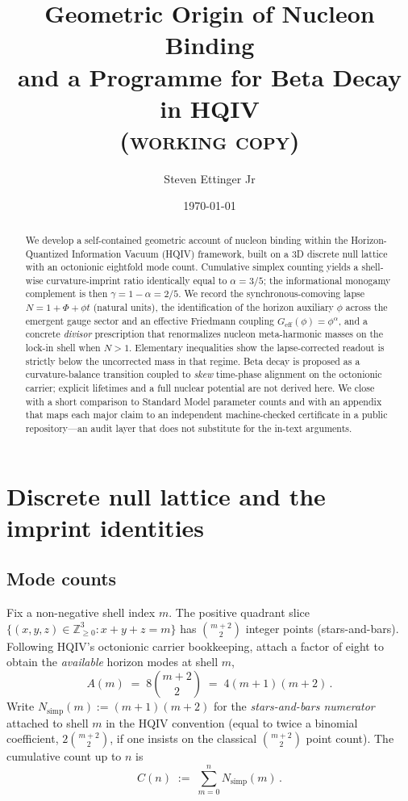 \documentclass[11pt,a4paper]{article}
\title{Geometric Origin of Nucleon Binding\\and a Programme for Beta Decay in HQIV\\{\large\scshape (working copy)}}
\author{Steven Ettinger Jr}
\date{\today}
\theoremstyle{plain}
\theoremstyle{definition}
\theoremstyle{remark}
\theoremstyle{plain}
\theoremstyle{definition}
\begin{document}
\maketitle

\begin{abstract}
We develop a self-contained geometric account of nucleon binding within the Horizon-Quantized Information Vacuum (HQIV) framework, built on a $3$D discrete null lattice with an octonionic eightfold mode count.
Cumulative simplex counting yields a shell-wise curvature-imprint ratio identically equal to $\alpha=3/5$; the informational monogamy complement is then $\gamma=1-\alpha=2/5$.
We record the synchronous-comoving lapse $N=1+\Phi+\phi t$ (natural units), the identification of the horizon auxiliary $\phi$ across the emergent gauge sector and an effective Friedmann coupling $G_{\mathrm{eff}}(\phi)=\phi^{\alpha}$, and a concrete \emph{divisor} prescription that renormalizes nucleon meta-harmonic masses on the lock-in shell when $N>1$.
Elementary inequalities show the lapse-corrected readout is strictly below the uncorrected mass in that regime.
Beta decay is proposed as a curvature-balance transition coupled to \emph{skew} time-phase alignment on the octonionic carrier; explicit lifetimes and a full nuclear potential are not derived here.
We close with a short comparison to Standard Model parameter counts and with an appendix that maps each major claim to an independent machine-checked certificate in a public repository---an audit layer that does not substitute for the in-text arguments.
\end{abstract}

\section{Discrete null lattice and the imprint identities}

\subsection{Mode counts}

Fix a non-negative shell index $m$.
The positive quadrant slice $\{(x,y,z)\in\mathbb{Z}_{\ge 0}^3 : x+y+z=m\}$ has $\binom{m+2}{2}$ integer points (stars-and-bars).
Following HQIV's octonionic carrier bookkeeping, attach a factor of eight to obtain the \emph{available} horizon modes at shell $m$,
\begin{equation}\label{eq:Am}
  A(m) \;=\; 8\binom{m+2}{2} \;=\; 4(m+1)(m+2)\,.
\end{equation}
Write $N_{\mathrm{simp}}(m):=(m+1)(m+2)$ for the \emph{stars-and-bars numerator} attached to shell $m$ in the HQIV convention (equal to twice a binomial coefficient, $2\binom{m+2}{2}$, if one insists on the classical $\binom{m+2}{2}$ point count).
The cumulative count up to $n$ is
\begin{equation}\label{eq:Cn}
  C(n) \;:=\; \sum_{m=0}^{n} N_{\mathrm{simp}}(m)\,.
\end{equation}
\end{document}

